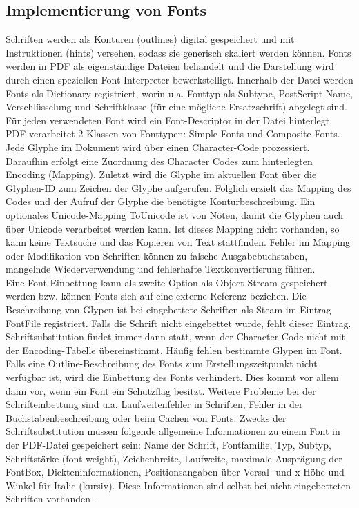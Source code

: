 \subsection{Implementierung von Fonts}
Schriften werden als Konturen (outlines) digital gespeichert und mit Instruktionen (hints) versehen, sodass sie generisch skaliert werden können. Fonts werden in PDF als eigenständige Dateien behandelt und die Darstellung wird durch einen speziellen Font-Interpreter bewerkstelligt. Innerhalb der Datei werden Fonts als Dictionary registriert, worin u.a. Fonttyp als Subtype, PostScript-Name, Verschlüsselung und Schriftklasse (für eine mögliche Ersatzschrift) abgelegt sind. Für jeden verwendeten Font wird ein Font-Descriptor in der Datei hinterlegt. PDF verarbeitet 2 Klassen von Fonttypen: Simple-Fonts und Composite-Fonts. Jede Glyphe im Dokument wird über einen Character-Code prozessiert. Daraufhin erfolgt eine Zuordnung des Character Codes zum hinterlegten Encoding (Mapping). Zuletzt wird die Glyphe im aktuellen Font über die Glyphen-ID zum Zeichen der Glyphe aufgerufen. Folglich erzielt das Mapping des Codes und der Aufruf der Glyphe die benötigte Konturbeschreibung. Ein optionales Unicode-Mapping ToUnicode ist von Nöten, damit die Glyphen auch über Unicode verarbeitet werden kann. Ist dieses Mapping nicht vorhanden, so kann keine Textsuche und das Kopieren von Text stattfinden. Fehler im Mapping oder Modifikation von Schriften können zu falsche Ausgabebuchstaben, mangelnde Wiederverwendung und fehlerhafte Textkonvertierung führen. \\
Eine Font-Einbettung kann als zweite Option als Object-Stream gespeichert werden bzw. können Fonts sich auf eine externe Referenz beziehen. Die Beschreibung von Glypen ist bei eingebettete Schriften als Steam im Eintrag FontFile registriert. Falls die Schrift nicht eingebettet wurde, fehlt dieser Eintrag. Schriftsubstitution findet immer dann statt, wenn der Character Code nicht mit der Encoding-Tabelle übereinstimmt. Häufig fehlen bestimmte Glypen im Font. Falls eine Outline-Beschreibung des Fonts zum Erstellungszeitpunkt nicht verfügbar ist, wird die Einbettung des Fonts verhindert. Dies kommt vor allem dann vor, wenn ein Font ein Schutzflag besitzt. Weitere Probleme bei der Schrifteinbettung sind u.a. Laufweitenfehler in Schriften, Fehler in der Buchstabenbeschreibung oder beim Cachen von Fonts. Zwecks der Schriftsubstitution müssen folgende allgemeine Informationen zu einem Font in der PDF-Datei gespeichert sein: Name der Schrift, Fontfamilie, Typ, Subtyp, Schriftstärke (font weight), Zeichenbreite, Laufweite, maximale Ausprägung der FontBox, Dickteninformationen, Positionsangaben über Versal- und x-Höhe und Winkel für Italic (kursiv). Diese Informationen sind selbst bei nicht eingebetteten Schriften vorhanden \cite{schneeberger}. 